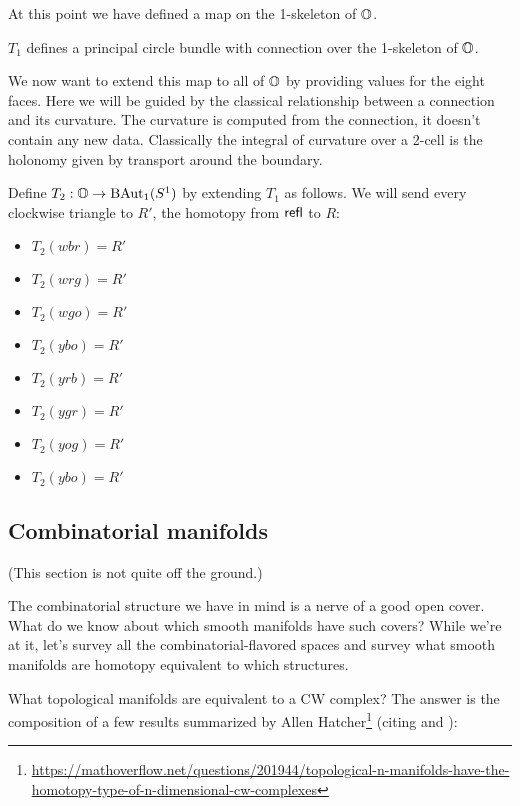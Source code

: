 \documentclass[12pt]{article}
\begin{document}
At this point we have defined a map on the 1-skeleton of \( \mathbb{O} \).

\begin{myclaim}
\( T_1 \) defines a principal circle bundle with connection over the 1-skeleton of \( \mathbb{O} \).
\end{myclaim}

We now want to extend this map to all of \( \mathbb{O} \) by providing values for the eight faces. Here we will be guided by the classical relationship between a connection and its curvature. The curvature is computed from the connection, it doesn't contain any new data. Classically the integral of curvature over a 2-cell is the holonomy given by transport around the boundary. 

\begin{mydef}
Define \( T_2:\mathbb{O}\to\mathrm{BAut}_1(S^1) \) by extending \( T_1 \) as follows. We will send every clockwise triangle to \( R' \), the homotopy from \( \mathsf{refl} \) to \( R \):
\begin{itemize}
\item \( T_2(wbr)=R' \) 
\item \( T_2(wrg)=R' \)
\item \( T_2(wgo)=R' \)
\item \( T_2(ybo)=R' \)
\item \( T_2(yrb)=R' \) 
\item \( T_2(ygr)=R' \)
\item \( T_2(yog)=R' \)
\item \( T_2(ybo)=R' \)
\end{itemize}
\end{mydef}


\subsection{Combinatorial manifolds}

(This section is not quite off the ground.)

The combinatorial structure we have in mind is a nerve of a good open cover. What do we know about which smooth manifolds have such covers? While we're at it, let's survey all the combinatorial-flavored spaces and survey what smooth manifolds are homotopy equivalent to which structures.

What topological manifolds are equivalent to a CW complex? The answer is the composition of a few results summarized by Allen Hatcher\footnote{\url{https://mathoverflow.net/questions/201944/topological-n-manifolds-have-the-homotopy-type-of-n-dimensional-cw-complexes}} (citing \cite{kirby_siebenmann} and \cite{freedman_quinn}):
\end{document}
